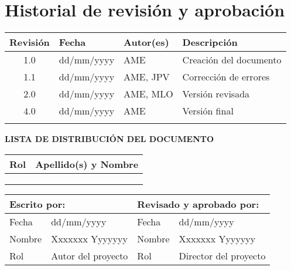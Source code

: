 \vspace*{0cm}

\chapter*{Historial de revisión y aprobación}

\begin{tabularx}{\textwidth}{|c|l|l|X|}
  \hline
    \textbf{Revisión} & \textbf{Fecha} & \textbf{Autor(es)} & \textbf{Descripción} \\
  \hline
    1.0 & dd/mm/yyyy & AME & Creación del documento \\
  \hline
    1.1 & dd/mm/yyyy & AME, JPV & Corrección de errores \\
  \hline
    2.0 & dd/mm/yyyy & AME, MLO & Versión revisada \\
  \hline
    4.0 & dd/mm/yyyy & AME & Versión final \\
  \hline
    & & & \\
  \hline
\end{tabularx}

\vspace{1cm}

\textbf{LISTA DE DISTRIBUCIÓN DEL DOCUMENTO}

\begin{tabularx}{\textwidth}{|l|X|}
  \hline
    \textbf{Rol} & \textbf{Apellido(s) y Nombre} \\
  \hline
    [Estudiante] &  \\
  \hline
    [Director del proyecto] &  \\
  \hline
    [Director 2 (sólo si aplica)] &  \\
  \hline
\end{tabularx}

\vspace{1cm}

\begin{tabularx}{\textwidth}{|l|X||l|X|}
  \hline
    \multicolumn{2}{|l||}{\textbf{Escrito por:}}  &  \multicolumn{2}{l|}{\textbf{Revisado y aprobado por:}} \\
  \hline
    Fecha &  dd/mm/yyyy & Fecha &  dd/mm/yyyy \\
  \hline
    Nombre &  Xxxxxxx Yyyyyyy & Nombre &  Xxxxxxx Yyyyyyy \\
  \hline
    Rol & Autor del proyecto & Rol & Director del proyecto \\
  \hline
\end{tabularx}

